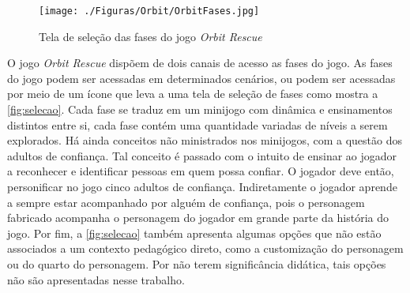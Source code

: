 
\vspace{-0.2cm}

\begin{figure}[htb]

	\caption{\label{fig:selecao}Tela de seleção das fases do jogo \textit{Orbit Rescue}}
  \begin{center}\vspace{-0.3cm}
    \texttt{[image: ./Figuras/Orbit/OrbitFases.jpg]}
	\end{center}\vspace{-0.5cm}

\end{figure}

\vspace{-0.3cm}

O jogo \textit{Orbit Rescue} dispõem de dois canais de acesso as fases do jogo. 
As fases do jogo podem ser acessadas em determinados cenários, ou podem ser acessadas por meio de um ícone que leva a uma tela de seleção de fases como mostra a \autoref{fig:selecao}. Cada fase se traduz em um minijogo com dinâmica e ensinamentos distintos entre si, cada fase contém uma quantidade variadas de níveis a serem explorados. Há ainda conceitos não ministrados nos minijogos, com a questão dos adultos de confiança. Tal conceito é passado com o intuito de ensinar ao jogador a reconhecer e identificar pessoas em quem possa confiar. O jogador deve então, personificar no jogo cinco adultos de confiança. Indiretamente o jogador aprende a sempre estar acompanhado por alguém de confiança, pois o personagem fabricado acompanha o personagem do jogador em grande parte da história do jogo. Por fim, a \autoref{fig:selecao} também apresenta algumas opções que não estão associados a um contexto pedagógico direto, como a customização do personagem ou do quarto do personagem. Por não terem significância didática, tais opções não são apresentadas nesse trabalho. 

